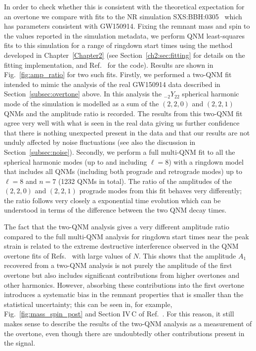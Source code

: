 In order to check whether this is consistent with the theoretical expectation for an overtone we compare with fits to the NR simulation SXS:BBH:0305~\cite{Lovelace:2016uwp} which has parameters consistent with GW150914.
Fixing the remnant mass and spin to the values reported in the simulation metadata, we perform QNM least-squares fits to this simulation for a range of ringdown start times using the method developed in Chapter~\ref{Chapter2} (see Section~\ref{ch2:sec:fitting} for details on the fitting implementation, and Ref.~\cite{qnmfits} for the code).
Results are shown in Fig.~\ref{fig:amp_ratio} for two such fits. 
Firstly, we performed a two-QNM fit intended to mimic the analysis of the real GW150914 data described in Section~\ref{subsec:overtone} above. 
In this analysis the ${}_{-2}Y_{22}$ spherical harmonic mode of the simulation is modelled as a sum of the $(2,2,0)$ and $(2,2,1)$ QNMs and the amplitude ratio is recorded. 
The results from this two-QNM fit agree very well with what is seen in the real data giving us further confidence that there is nothing unexpected present in the data and that our results are not unduly affected by noise fluctuations (see also the discussion in Section~\ref{subsec:noise}). 
Secondly, we perform a full multi-QNM fit to all the spherical harmonic modes (up to and including $\ell = 8$) with a ringdown model that includes all QNMs (including both prograde and retrograde modes) up to $\ell = 8$ and $n = 7$ (1232 QNMs in total).
The ratio of the amplitudes of the $(2,2,0)$ and $(2,2,1)$ prograde modes from this fit behaves very differently; the ratio follows very closely a exponential time evolution which can be understood in terms of the difference between the two QNM decay times.

The fact that the two-QNM analysis gives a very different amplitude ratio compared to the full multi-QNM analysis for ringdown start times near the peak strain is related to the extreme destructive interference observed in the QNM overtone fits of Refs.~\cite{Giesler:2019uxc, Bhagwat:2019dtm, Ota:2019bzl, Cook:2020otn, JimenezForteza:2020cve, Dhani:2020nik, Finch:2021iip, Forteza:2021wfq, Dhani:2021vac, MaganaZertuche:2021syq} with large values of $N$.
This shows that the amplitude $A_1$ recovered from a two-QNM analysis is not purely the amplitude of the first overtone but also includes significant contributions from higher overtones and other harmonics. 
However, absorbing these contributions into the first overtone introduces a systematic bias in the remnant properties that is smaller than the statistical uncertainty; this can be seen in, for example, Fig.~\ref{fig:mass_spin_post} and Section IV\,C of Ref.~\cite{Giesler:2019uxc}. 
For this reason, it still makes sense to describe the results of the two-QNM analysis as a measurement of the overtone, even though there are undoubtedly other contributions present in the signal.


